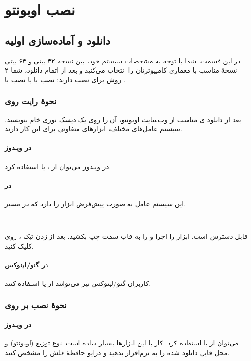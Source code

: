 \chapter{نصب اوبونتو}
\section{دانلود و آماده‌سازی اولیه}
در این قسمت، شما با توجه به مشخصات سیستم خود، بین نسخه ۳۲ بیتی و ۶۴ بیتی نسخهٔ مناسب با معماری کامپیوترتان را انتخاب می‌کنید و بعد از اتمام دانلود، شما ۲ روش برای نصب دارید: نصب با  یا نصب با .

\subsection[نحوهٔ رایت روی DVD]{نحوهٔ رایت روی }
بعد از دانلود ی مناسب از وب‌سایت اوبونتو، آن را روی یک دیسک نوری خام بنویسید. سیستم عامل‌های مختلف، ابزارهای متفاوتی برای این کار دارند.

\subsubsection{در ویندوز}
در ویندوز می‌توان از ،  یا  استفاده کرد.

\subsubsection{در }
این سیستم عامل به صورت پیش‌فرض ابزار  را دارد که در مسیر:\\
\begin{flushleft}
\\
\end{flushleft}
قابل دسترس است. ابزار  را اجرا و  را به قاب سمت چپ بکشید. بعد از زدن تیک ، روی  کلیک کنید.

\subsubsection{در گنو/لینوکس}
کاربران گنو/لینوکس نیز می‌توانند از  یا  استفاده کنند.

\subsection[نحوهٔ نصب بر روی USB]{نحوهٔ نصب بر روی }
\subsubsection{در ویندوز}
می‌توان از  یا  استفاده کرد. کار با این ابزارها بسیار ساده است. نوع توزیع (اوبونتو) و محل فایل  دانلود شده را به نرم‌افزار بدهید و درایو حافظهٔ فلش را مشخص کنید.

